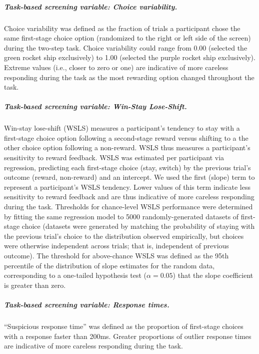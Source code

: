 \documentclass[a4paper,notitlepage,12pt]{article}
\begin{document}
\subparagraph{Task-based screening variable: Choice variability.} Choice variability was defined as the fraction of trials a participant chose the same first-stage choice option (randomized to the right or left side of the screen) during the two-step task. Choice variability could range from 0.00 (selected the green rocket ship exclusively) to 1.00 (selected the purple rocket ship exclusively). Extreme values (i.e., closer to zero or one) are indicative of more careless responding during the task as the most rewarding option changed throughout the task.  

\subparagraph{Task-based screening variable: Win-Stay Lose-Shift.} Win-stay lose-shift (WSLS) measures a participant's tendency to stay with a first-stage choice option following a second-stage reward versus shifting to a the other choice option following a non-reward. WSLS thus measures a participant's sensitivity to reward feedback. WSLS was estimated per participant via regression, predicting each first-stage choice (stay, switch) by the previous trial's outcome (reward, non-reward) and an intercept. We used the first (slope) term to represent a participant's WSLS tendency. Lower values of this term indicate less sensitivity to reward feedback and are thus indicative of more careless responding during the task. Thresholds for chance-level WSLS performance were determined by fitting the same regression model to 5000 randomly-generated datasets of first-stage choice (datasets were generated by matching the probability of staying with the previous trial's choice to the distribution observed empirically, but choices were otherwise independent across trials; that is, independent of previous outcome). The threshold for above-chance WSLS was defined as the 95th percentile of the distribution of slope estimates for the random data, corresponding to a one-tailed hypothesis test ($\alpha = 0.05$) that the slope coefficient is greater than zero. 

\subparagraph{Task-based screening variable: Response times.} ``Suspicious response time'' was defined as the proportion of first-stage choices with a response faster than 200ms. Greater proportions of outlier response times are indicative of more careless responding during the task.
\end{document}
